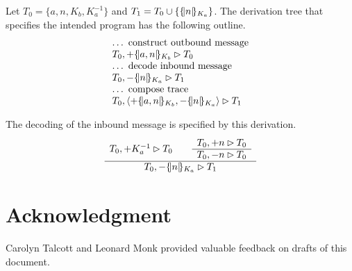 \documentclass[12pt]{article}
\theoremstyle{definition}
\begin{document}
Let $T_0=\{a,n,K_b,K^{-1}_a\}$ and $T_1=T_0\cup\{\{\!|n|\!\}_{K_a}\}$.  The
derivation tree that specifies the intended program has the following
outline.
$$\begin{array}{l}
\mbox{\ldots~construct outbound message}  \\
\flow{T_0}{\outbnd\enc{a,n}{K_b}}{T_0}\\
\mbox{\ldots~decode inbound message}  \\
\flow{T_0}{\inbnd\enc{n}{K_a}}{T_1} \\
\mbox{\ldots~compose trace}  \\
\flow{T_0}{\seq{\outbnd\enc{a,n}{K_b},\inbnd\enc{n}{K_a}}}{T_1}
\end{array}$$

The decoding of the inbound message is specified by this derivation.
$$\begin{array}{c}T_0,\mathord + K^{-1}_a\rhd T_0\qquad
\begin{array}{c}T_0,\mathord + n\rhd T_0\\\hline T_0,\mathord - n\rhd T_0\end{array}\\\hline T_0,\mathord -\{\!|n|\!\}_{K_a}\rhd T_1\end{array}$$

\section*{Acknowledgment}

Carolyn Talcott and Leonard Monk provided valuable feedback on drafts
of this document.




\printindex

\tableofcontents
\end{document}
